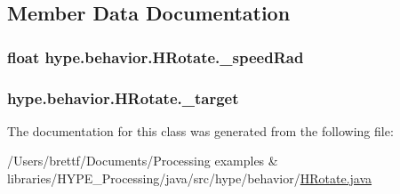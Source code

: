 \subsection{Member Data Documentation}
\hypertarget{classhype_1_1behavior_1_1_h_rotate_a5061f65cfd851f59f492ae6324eb7df6}{
\subsubsection[{\-\_\-speed\-Rad}]{\setlength{\rightskip}{0pt plus 5cm}float hype.\-behavior.\-H\-Rotate.\-\_\-speed\-Rad\hspace{0.3cm}{\ttfamily [protected]}}}\label{classhype_1_1behavior_1_1_h_rotate_a5061f65cfd851f59f492ae6324eb7df6}
\hypertarget{classhype_1_1behavior_1_1_h_rotate_a820318c2953c93624ab29ebe3f3e6182}{
\subsubsection[{\-\_\-target}]{ hype.\-behavior.\-H\-Rotate.\-\_\-target\hspace{0.3cm}{\ttfamily [protected]}}}\label{classhype_1_1behavior_1_1_h_rotate_a820318c2953c93624ab29ebe3f3e6182}


The documentation for this class was generated from the following file\-:\begin{DoxyCompactItemize}
\item 
/\-Users/brettf/\-Documents/\-Processing examples \& libraries/\-H\-Y\-P\-E\-\_\-\-Processing/java/src/hype/behavior/\hyperlink{_h_rotate_8java}{H\-Rotate.\-java}\end{DoxyCompactItemize}
